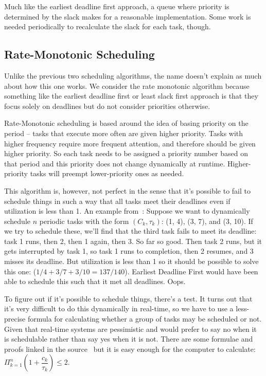 Much like the earliest deadline first approach, a queue where priority is determined by the slack makes for a reasonable implementation. Some work is needed periodically to recalculate the slack for each task, though. 

\subsection*{Rate-Monotonic Scheduling}

Unlike the previous two scheduling algorithms, the name doesn't explain as much about how this one works. We consider the rate monotonic algorithm because something like the earliest deadline first or least slack first approach is that they focus solely on deadlines but do not consider priorities otherwise. 

Rate-Monotonic scheduling is based around the idea of basing priority on the period -- tasks that execute more often are given higher priority. Tasks with higher frequency require more frequent attention, and therefore should be given higher priority. So each task needs to be assigned a priority number based on that period and this priority does not change dynamically at runtime. Higher-priority tasks will preempt lower-priority ones as needed.

This algorithm is, however, not perfect in the sense that it's possible to fail to schedule things in such a way that all tasks meet their deadlines even if utilization is less than 1. An example from~\cite{mte241}: Suppose we want to dynamically schedule $n$ periodic tasks with the form $(C_{k}, \tau _{k})$: (1, 4), (3, 7), and (3, 10). If we try to schedule these, we'll find that the third task fails to meet its deadline: task 1 runs, then 2, then 1 again, then 3. So far so good. Then task 2 runs, but it gets interrupted by task 1, so task 1 runs to completion, then 2 resumes, and 3 misses its deadline. But utilization is less than 1 so it should be possible to solve this one: ($1/4 + 3/7 + 3/10 = 137/140$). Earliest Deadline First would have been able to schedule this such that it met all deadlines. Oops.

To figure out if it's possible to schedule things, there's a test. It turns out that it's very difficult to do this dynamically in real-time, so we have to use a less-precise formula for calculating whether a group of tasks may be scheduled or not. Given that real-time systems are pessimistic and would prefer to say no when it is schedulable rather than say yes when it is not. There are some formulae and proofs linked in the source~\cite{mte241} but it is easy enough for the computer to calculate: $\Pi^{n}_{k=1}( 1 + \dfrac{c_k}{\tau _k}) \leq 2$.

